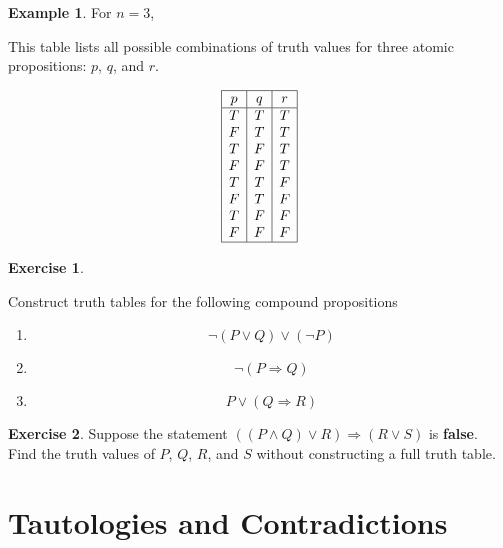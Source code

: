 \documentclass[
]{book}
\theoremstyle{definition}
\theoremstyle{definition}
\newtheorem{example}{Example}[chapter]
\theoremstyle{definition}
\newtheorem{exercise}{Exercise}[chapter]
\theoremstyle{definition}
\theoremstyle{remark}
\begin{document}
\begin{example}
\protect\hypertarget{exm:unnamed-chunk-34}{}\label{exm:unnamed-chunk-34}For \(n=3\),

This table lists all possible combinations of truth values for three atomic propositions: \(p\), \(q\), and \(r\).

\[
\begin{array}{|c|c|c|}
\hline
p & q & r \\
\hline
T & T & T \\
F & T & T \\
T & F & T \\
F & F & T \\
T & T & F \\
F & T & F \\
T & F & F \\
F & F & F \\
\hline
\end{array}
\]
\end{example}

\begin{exercise}
\protect\hypertarget{exr:unnamed-chunk-35}{}\label{exr:unnamed-chunk-35}

Construct truth tables for the following compound propositions

\begin{enumerate}
\def\labelenumi{\alph{enumi})}
\item
  \[
  \neg (P \lor Q) \lor (\neg P)
  \]
\item
  \[
  \neg (P \Rightarrow Q)
  \]
\item
  \[
  P \lor (Q \Rightarrow R)
  \]
\end{enumerate}

\end{exercise}

\begin{exercise}
\protect\hypertarget{exr:unnamed-chunk-36}{}\label{exr:unnamed-chunk-36}Suppose the statement \(((P \land Q) \lor R) \Rightarrow (R \lor S)\) is \textbf{false}.\\
Find the truth values of \(P\), \(Q\), \(R\), and \(S\) without constructing a full truth table.
\end{exercise}

\section{Tautologies and Contradictions}\label{tautologies-and-contradictions}
\end{document}
